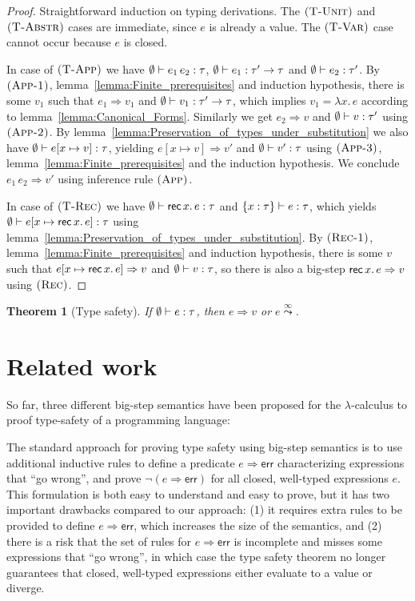 \documentclass[12pt,a2paper,draft]{article}
\newcommand{\abstr}[2]{\ensuremath{\lambda{#1}.\,{#2}}}
\newcommand{\app}[2]{\ensuremath{{#1}\,{#2}}}
\newcommand{\rec}[2]{\ensuremath{{\normalfont\textsf{rec}}\,{#1}.\,{#2}}}
\newcommand{\Tj}[3]{\mbox{\ensuremath{{#1}\vdash{#2}:{#3}}}}
\newcommand{\tj}[2]{\Tj{\emptyset}{#1}{#2}}
\newcommand{\rn}[1]{\mbox{\ensuremath{\textsc{(#1)}}}}
\newtheorem{theorem}{Theorem}
\begin{document}
\begin{proof}
  Straightforward induction on typing derivations. The \rn{T-Unit} and \rn{T-Abstr}
  cases are immediate, since $e$ is already a value. The \rn{T-Var} case cannot occur
  because $e$ is closed.

  In case of \rn{T-App} we have $\tj{\app{e_1}{e_2}}{\tau}$, $\tj{e_1}{\tau' \to \tau}$
  and $\tj{e_2}{\tau'}$. By \rn{App-1}, lemma~\ref{lemma:Finite_prerequisites} and
  induction hypothesis, there is some $v_1$ such that $e_1 \Rightarrow v_1$ and
  $\tj{v_1}{\tau' \to \tau}$, which implies $v_1 = \abstr{x}{e}$ according to
  lemma~\ref{lemma:Canonical_Forms}. Similarly we get $e_2 \Rightarrow v$ and
  $\tj{v}{\tau'}$ using \rn{App-2}. By lemma~\ref{lemma:Preservation_of_types_under_substitution}
  we also have $\tj{e[x \mapsto v]}{\tau}$, yielding $e[x \mapsto v] \Rightarrow v'$
  and $\tj{v'}{\tau}$ using \rn{App-3}, lemma~\ref{lemma:Finite_prerequisites}
  and the induction hypothesis. We conclude $\app{e_1}{e_2} \Rightarrow v'$ using
  inference rule \rn{App}.

  In case of \rn{T-Rec} we have $\tj{\rec{x}{e}}{\tau}$ and $\Tj{\{x:\tau\}}{e}{\tau}$,
  which yields $\tj{e[x \mapsto \rec{x}{e}]}{\tau}$ using
  lemma~\ref{lemma:Preservation_of_types_under_substitution}. By \rn{Rec-1},
  lemma~\ref{lemma:Finite_prerequisites} and induction hypothesis, there is some
  $v$ such that $e[x \mapsto \rec{x}{e}] \Rightarrow v$ and $\tj{v}{\tau}$, so
  there is also a big-step $\rec{x}{e} \Rightarrow v$ using \rn{Rec}.
\end{proof}

\begin{theorem}[Type safety]
  If $\tj{e}{\tau}$, then $e \Rightarrow v$ or $e \stackrel{\infty}{\leadsto}$.
\end{theorem}


\section{Related work}

So far, three different big-step semantics have been proposed for the $\lambda$-calculus to proof
type-safety of a programming language:

The standard approach \cite{Tofte87} for proving type safety using big-step semantics is to use
additional inductive rules to define a predicate $e \Rightarrow \textsf{err}$ characterizing expressions that
``go wrong'', and prove $\neg(e \Rightarrow \textsf{err})$ for all closed,
well-typed expressions $e$. This formulation is both easy to understand and easy to prove, but
it has two important drawbacks compared to our approach:
(1) it requires extra rules to be provided to define $e \Rightarrow \textsf{err}$,
which increases the size of the semantics, and (2) there is a risk that the set of rules for
$e \Rightarrow \textsf{err}$ is incomplete and misses some expressions that ``go wrong'',
in which case the type safety theorem no longer guarantees that closed, well-typed expressions
either evaluate to a value or diverge.
\end{document}
